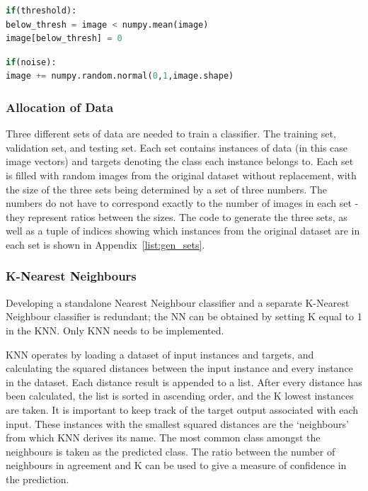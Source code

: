 \begin{lstlisting}[language=Python, caption=Thresholding, captionpos=b, label={list:thresholding}]
if(threshold):
below_thresh = image < numpy.mean(image)
image[below_thresh] = 0
\end{lstlisting}

\begin{lstlisting}[language=Python, caption=Adding noise to an image, captionpos=b, label={list:noise}]
if(noise):
image += numpy.random.normal(0,1,image.shape)
\end{lstlisting}


 

\subsubsection{Allocation of Data}

Three different sets of data are needed to train a classifier. The training set, validation set, and testing set. Each set contains instances of data (in this case image vectors) and targets denoting the class each instance belongs to. Each set is filled with random images from the original dataset without replacement, with the size of the three sets being determined by a set of three numbers. The numbers do not have to correspond exactly to the number of images in each set - they represent ratios between the sizes. The code to generate the three sets, as well as a tuple of indices showing which instances from the original dataset are in each set is shown in Appendix~\ref{list:gen_sets}.

\subsubsection{K-Nearest Neighbours}
Developing a standalone Nearest Neighbour classifier and a separate K-Nearest Neighbour classifier is redundant; the NN can be obtained by setting K equal to 1 in the KNN. Only KNN needs to be implemented.

KNN operates by loading a dataset of input instances and targets, and calculating the squared distances between the input instance and every instance in the dataset. Each distance result is appended to a list. After every distance has been calculated, the list is sorted in ascending order, and the K lowest instances are taken. It is important to keep track of the target output associated with each input. These instances with the smallest squared distances are the `neighbours' from which KNN derives its name. The most common class amongst the neighbours is taken as the predicted class. The ratio between the number of neighbours in agreement and K can be used to give a measure of confidence in the prediction.


